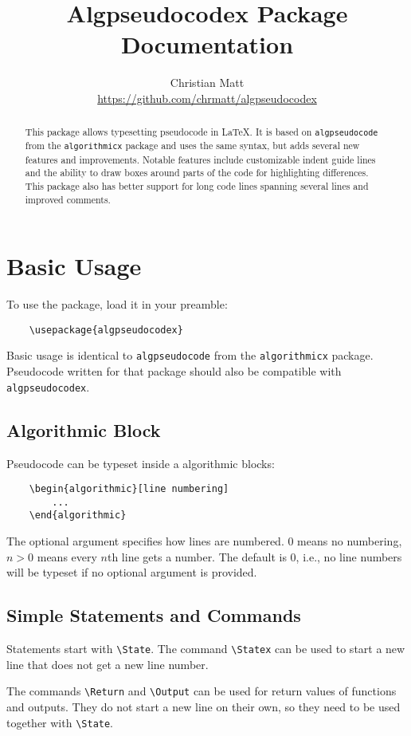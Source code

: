 \documentclass[11pt,a4paper,USenglish]{article}
\title{\bf{Algpseudocodex Package Documentation}}
\author{Christian Matt \\ \url{https://github.com/chrmatt/algpseudocodex}}
\begin{document}
\maketitle

\begin{abstract}
	This package allows typesetting pseudocode in \LaTeX. It is based on \texttt{algpseudocode} from the \texttt{algorithmicx} package and uses the same syntax, but adds several new features and improvements. Notable features include customizable indent guide lines and the ability to draw boxes around parts of the code for highlighting differences. This package also has better support for long code lines spanning several lines and improved comments.
\end{abstract}

\section{Basic Usage}
To use the package, load it in your preamble:
\begin{verbatim}
	\usepackage{algpseudocodex}
\end{verbatim}

Basic usage is identical to \texttt{algpseudocode} from the \texttt{algorithmicx} package. Pseudocode written for that package should also be compatible with \texttt{algpseudocodex}.

\subsection{Algorithmic Block}
Pseudocode can be typeset inside a algorithmic blocks:
\begin{verbatim}
	\begin{algorithmic}[line numbering]
	    ...
	\end{algorithmic}
\end{verbatim}
The optional argument specifies how lines are numbered. $0$ means no numbering, $n > 0$ means every $n$th line gets a number. The default is $0$, i.e., no line numbers will be typeset if no optional argument is provided.

\subsection{Simple Statements and Commands}
Statements start with \verb|\State|. The command \verb|\Statex| can be used to start a new line that does not get a new line number.

The commands \verb|\Return| and \verb|\Output| can be used for return values of functions and outputs. They do not start a new line on their own, so they need to be used together with \verb|\State|.
\end{document}
